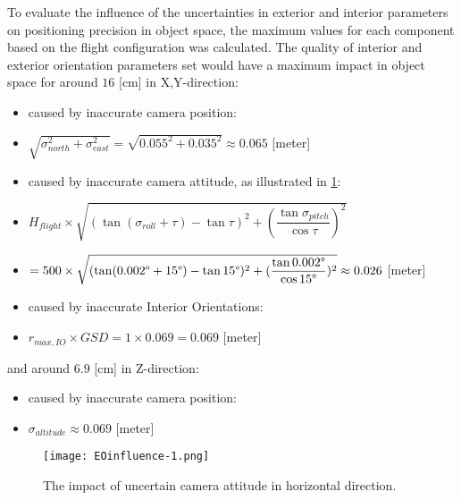 \clearpage
To evaluate the influence of the uncertainties in exterior and interior parameters on positioning precision in object space, the maximum values for each component based on the flight configuration was calculated.
The quality of interior and exterior orientation parameters set would have a maximum impact in object space for around $16$ [cm] in X,Y-direction:
\begin{itemize}
      \item caused by inaccurate camera position: 
      \item [] $\sqrt{\sigma_{north}^2+\sigma_{east}^2}=\sqrt{0.055^2+0.035^2}\approx0.065$ [meter]
      \item caused by inaccurate camera attitude, as illustrated in \cref{fig:EOinfluence-1}:
      \item [] $ H_{flight}\times\sqrt{(\tan(\sigma_{roll}+\tau)-\tan\tau)^2+(\dfrac{\tan\sigma_{pitch}}{\cos\tau})^2}$
      \item [] $=500\times\sqrt{(\tan(0.002\degree+15\degree)-\tan15\degree)^2+(\dfrac{\tan0.002\degree}{\cos15\degree})^2}\approx0.026$ [meter]
      \item caused by inaccurate Interior Orientations:
      \item [] $r_{max, IO}\times GSD=1\times0.069=0.069$ [meter]
\end{itemize}
and around $6.9$ [cm] in Z-direction:
\begin{itemize}
      \item caused by inaccurate camera position:
      \item [] $\sigma_{altitude}\approx0.069$ [meter]
\end{itemize}

\begin{figure}%
	\centering
	\texttt{[image: EOinfluence-1.png]}
	\caption{\small The impact of uncertain camera attitude in horizontal direction.}
	\label{fig:EOinfluence-1}
\end{figure}

